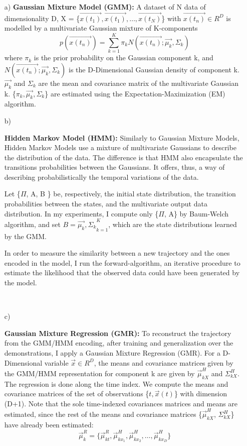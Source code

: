 \documentclass[conference]{IEEEtran}
\begin{document}
\begin{itemize}
\item[a)]{
    \textbf{Gaussian Mixture Model (GMM):} A dataset of N data of dimensionality D, X = \{$\vec{x(t_{1})}, \vec{x(t_{1})},\dots,\vec{x(t_{N})}$\} with $\vec{x(t_{n})} \in R^{D}$ is modelled by a multivariate Gaussian mixture of K-components
    \begin{equation}
        p(\vec{x(t_{n})}) = \sum_{k=1}^K \pi_{k} N (\vec{x(t_{n})}; \vec{\mu_{k}}, \Sigma_{k})
    \end{equation}
    where $\pi_{k}$ is the prior probability on the Gaussian component k, and $N (\vec{x(t_{n})}; \vec{\mu_{k}}, \Sigma_{k})$ is the D-Dimensional Gaussian density of component k. $\vec{\mu_{k}}$ and $\Sigma_{k}$ are the mean and covariance matrix of the multivariate Gaussian k. \{$\pi_{k}, \vec{\mu_{k}} , \Sigma_{k}$\} are estimated using the Expectation-Maximization (EM) algorithm.
}    
\\
\item[b)]{
    \textbf{Hidden Markov Model (HMM):} Similarly to Gaussian Mixture Models, Hidden Markov Models use a mixture of multivariate Gaussians to describe the distribution of the data.  The difference is that HMM also encapsulate the transitions probabilities between the Gaussians. It offers, thus, a way of describing probabilistically the temporal variations of the data.

    Let \{$\Pi$, A, B \} be, respectively, the initial state distribution, the transition probabilities between the states, and the multivariate output data distribution. In my experiments, I compute only \{$\Pi$, A\} by Baum-Welch algorithm, and set $B = {\vec{\mu_{k}}, \Sigma_{k}}_{k=1}^{K}$, which are the state distributions learned by the GMM. 
    
    In order to measure the similarity between a new trajectory and the ones encoded in the model, I run the forward-algorithm, an iterative procedure to estimate the likelihood that the observed data could have been generated by the model.
}
\\
\item[c)]{
    \textbf{Gaussian Mixture Regression (GMR):} To reconstruct the trajectory from the GMM/HMM encoding, after training and generalization over the demonstrations, I apply a Gaussian Mixture Regression (GMR). For a D-Dimensional variable $\vec{x} \in R^{D}$, the means and covariance matrices given by the GMM/HMM representation for component k are given by $\vec{\mu}_{kX}^{H}$ and ${\Sigma}_{kX}^{H}$. The regression is done along the time index. We compute the means and covariance matrices of the set of observations \{$t, \vec{x}(t)$\} with dimension (D+1). Note that the sole time-indexed covariances matrices and means are estimated, since the rest of the means and covariance matrices \{$\vec{\mu}_{kX}^{H}$, ${\Sigma}_{kX}^{H}$\} have already been estimated:
    \begin{equation}
        \vec{\mu}_{k}^{R} = \{\vec{\mu}_{kt}^{R}, \vec{\mu}_{kx_{1}}^{H}, \vec{\mu}_{kx_{2}}^{H}, \dots, \vec{\mu}_{kx_{D}}^{H}\}
    \end{equation}

}
\end{itemize}
\end{document}
